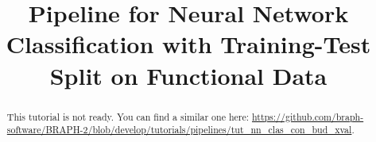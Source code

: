 \documentclass[justified]{tufte-handout}
\title[Classification Training-Test Split Functional Data]{Pipeline for Neural Network Classification with Training-Test Split on Functional Data}
\begin{document}
\maketitle

\begin{abstract}
\noindent
This tutorial is not ready. You can find a similar one here: \url{https://github.com/braph-software/BRAPH-2/blob/develop/tutorials/pipelines/tut_nn_clas_con_bud_xval}.
\end{abstract}
\end{document}
